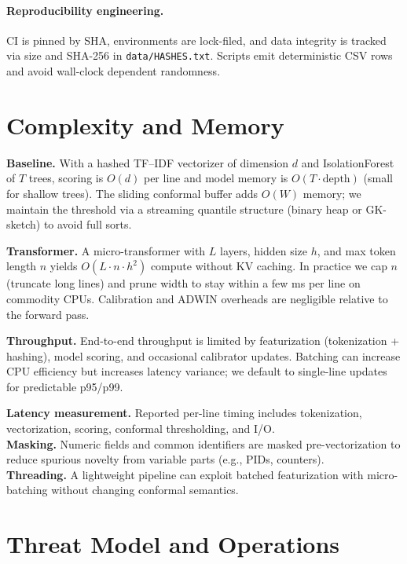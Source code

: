 \documentclass[10pt,twocolumn]{article}
\begin{document}
\paragraph{Reproducibility engineering.} CI is pinned by SHA, environments are lock-filed, and data integrity is tracked via size and SHA-256 in \texttt{data/HASHES.txt}. Scripts emit deterministic CSV rows and avoid wall-clock dependent randomness.


\section{Complexity and Memory}
\textbf{Baseline.} With a hashed TF--IDF vectorizer of dimension $d$ and IsolationForest of $T$ trees, scoring is $O(d)$ per line and model memory is $O(T \cdot \text{depth})$ (small for shallow trees). The sliding conformal buffer adds $O(W)$ memory; we maintain the threshold via a streaming quantile structure (binary heap or GK-sketch) to avoid full sorts.

\textbf{Transformer.} A micro-transformer with $L$ layers, hidden size $h$, and max token length $n$ yields $O(L \cdot n \cdot h^2)$ compute without KV caching. In practice we cap $n$ (truncate long lines) and prune width to stay within a few ms per line on commodity CPUs. Calibration and ADWIN overheads are negligible relative to the forward pass.

\textbf{Throughput.} End-to-end throughput is limited by featurization (tokenization + hashing), model scoring, and occasional calibrator updates. Batching can increase CPU efficiency but increases latency variance; we default to single-line updates for predictable p95/p99.





\textbf{Latency measurement.} Reported per-line timing includes tokenization, vectorization, scoring, conformal thresholding, and I/O. \\
\textbf{Masking.} Numeric fields and common identifiers are masked pre-vectorization to reduce spurious novelty from variable parts (e.g., PIDs, counters). \\
\textbf{Threading.} A lightweight pipeline can exploit batched featurization with micro-batching without changing conformal semantics.

\section{Threat Model and Operations}
\end{document}
